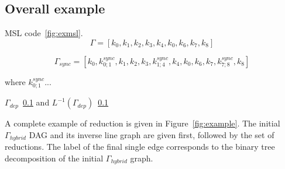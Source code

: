 \subsection{Overall example}

MSL code~\ref{fig:exmsl}. 
\begin{equation*}
\Gamma = [k_0,k_1,k_2,k_3,k_4,k_0,k_6,k_7,k_8]
\end{equation*}

\begin{equation*}
\Gamma_{sync} = [k_0,k_{0;1}^{sync},k_1,k_2,k_3,k_{1;4}^{sync},k_4,k_0,k_6,k_7,k_{7;8}^{sync},k_8]
\end{equation*}

where $k_{0;1}^{sync}$... 

$\Gamma_{dep}$~\ref{} and $L^{-1}(\Gamma_{dep})$~\ref{}

A complete example of reduction is given in Figure~\ref{fig:example}. The initial $\Gamma_{hybrid}$ DAG and its inverse line graph are given first, followed by the set of reductions. The label of the final single edge corresponds to the binary tree decomposition of the initial $\Gamma_{hybrid}$ graph. 

